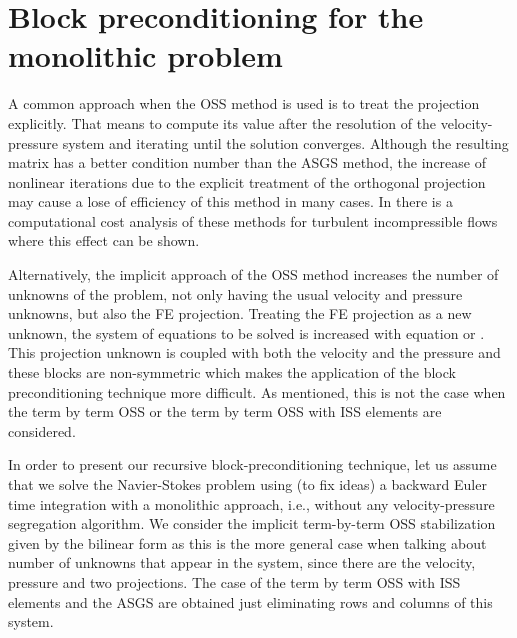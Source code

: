 \section{Block preconditioning for the monolithic problem}
\label{sec-C5_block_precond}

A common approach when the OSS method is used is to treat the projection explicitly. That means to compute its value after the resolution of the velocity-pressure system and iterating until the solution converges. Although the resulting matrix has a better condition number than the ASGS method, the increase of nonlinear iterations due to the explicit treatment of the orthogonal projection may cause a lose of efficiency of this method in many cases. In \cite{colomes_assessment_2015} there is a computational cost analysis of these methods for turbulent incompressible flows where this effect can be shown.

Alternatively, the implicit approach of the OSS method increases the number of unknowns of the problem, not only having the usual velocity and pressure unknowns, but also the FE projection. Treating the FE projection as a new unknown, the system of equations to be solved is increased with equation  or . This projection unknown is coupled with both the velocity and the pressure and these blocks are non-symmetric which makes the application of the block preconditioning technique more difficult. As mentioned, this is not the case when the term by term OSS or the term by term OSS with ISS elements are considered.



In order to present our recursive block-preconditioning technique, let us assume that we solve the Navier-Stokes problem using (to fix ideas) a backward Euler time integration with a monolithic approach, i.e., without any velocity-pressure segregation algorithm. We consider the implicit term-by-term OSS stabilization given by the bilinear form  as this is the more general case when talking about number of unknowns that appear in the system, since there are the velocity, pressure and two projections. The case of the term by term OSS with ISS elements and the ASGS are obtained just eliminating rows and columns of this system.


